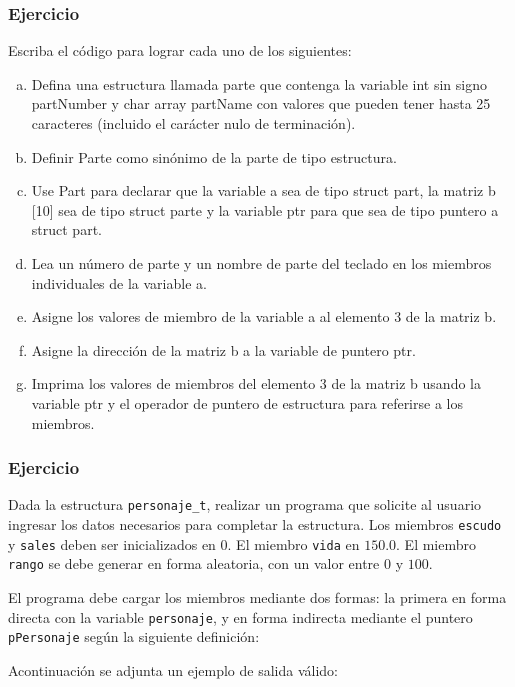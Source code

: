 \subsubsection{Ejercicio}
Escriba el código para lograr cada uno de los siguientes:
\begin{enumerate}[a)]
  \item Defina una estructura llamada parte que contenga la variable int sin signo partNumber y char array partName con valores que pueden tener hasta 25 caracteres (incluido el carácter nulo de terminación).
  \item Definir Parte como sinónimo de la parte de tipo estructura.
  \item Use Part para declarar que la variable a sea de tipo struct part, la matriz b [10] sea de tipo struct parte y la variable ptr para que sea de tipo puntero a struct part.
  \item Lea un número de parte y un nombre de parte del teclado en los miembros individuales de la variable a.
  \item Asigne los valores de miembro de la variable a al elemento 3 de la matriz b.
  \item Asigne la dirección de la matriz b a la variable de puntero ptr.
  \item Imprima los valores de miembros del elemento 3 de la matriz b usando la variable ptr y el operador de puntero de estructura para referirse a los miembros.
\end{enumerate}
\subsubsection{Ejercicio}
Dada la estructura  \texttt{personaje\_t}, realizar un programa que solicite al usuario ingresar los datos necesarios para completar la estructura.
Los miembros \texttt{escudo} y \texttt{sales} deben ser inicializados en 0. 
El miembro \texttt{vida} en $150.0$.
El miembro \texttt{rango} se debe generar en forma aleatoria, con un valor entre $0$ y $100$.
\lstset{inputencoding=utf8/latin1}

El programa debe cargar los miembros mediante dos formas: la primera en forma directa con la variable \texttt{personaje}, y en forma indirecta mediante el puntero \texttt{pPersonaje} según la siguiente definición:

\lstset{inputencoding=utf8/latin1}

Acontinuación se adjunta un ejemplo de salida válido:
\lstset{inputencoding=utf8/latin1}
{\small

}

